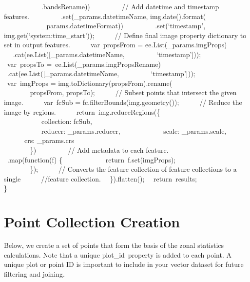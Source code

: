 \documentclass[
  letterpaper,
  DIV=11,
  numbers=noendperiod]{scrreprt}
\begin{document}
\hspace*{0.333em} ~ ~ ~ ~ ~ ~ ~.bandsRename))~ ~ ~ ~ ~ ~// Add datetime
and timestamp features.~ ~ ~ ~ ~ ~.set(\_params.datetimeName,
img.date().format(\\
\hspace*{0.333em} ~ ~ ~ ~ ~ ~ ~\_params.datetimeFormat))~ ~ ~ ~ ~
~.set(`timestamp', img.get(`system:time\_start'));~ ~ ~ ~// Define final
image property dictionary to set in output features.~ ~ ~ ~var~propsFrom
= ee.List(\_params.imgProps)~ ~ ~ ~ ~
~.cat(ee.List({[}\_params.datetimeName,~ ~ ~ ~ ~ ~`timestamp'{]}));~ ~ ~
~var~propsTo =~ee.List(\_params.imgPropsRename)~ ~ ~ ~ ~
~.cat(ee.List({[}\_params.datetimeName,~ ~ ~ ~ ~ ~`timestamp'{]}));~ ~ ~
~var~imgProps = img.toDictionary(propsFrom).rename(\\
\hspace*{0.333em} ~ ~ ~ ~ ~propsFrom, propsTo);~ ~ ~ ~// Subset points
that intersect the given image.~ ~ ~ ~var~fcSub =
fc.filterBounds(img.geometry());~ ~ ~ ~// Reduce the image by regions.~
~ ~ ~return~img.reduceRegions(\{\\
\hspace*{0.333em} ~ ~ ~ ~ ~ ~ ~collection: fcSub,\\
\hspace*{0.333em} ~ ~ ~ ~ ~ ~ ~reducer: \_params.reducer,~ ~ ~ ~ ~ ~ ~
~scale: \_params.scale,~ ~ ~ ~ ~ ~ ~ ~crs: \_params.crs\\
\hspace*{0.333em} ~ ~ ~ ~ ~\})~ ~ ~ ~ ~ ~// Add metadata to each
feature.~ ~ ~ ~ ~ ~.map(function(f) \{~ ~ ~ ~ ~ ~ ~
~return~f.set(imgProps);\\
\hspace*{0.333em} ~ ~ ~ ~ ~\});~ ~ ~ ~// Converts the feature collection
of feature collections to a single~ ~ ~ ~//feature collection.~
~\}).flatten();~ ~return~results;\\
\}

\hypertarget{point-collection-creation}{%
\section{Point Collection Creation}\label{point-collection-creation}}

Below, we create a set of points that form the basis of the zonal
statistics calculations. Note that a unique plot\_id~property is added
to each point. A unique plot or point ID is important to include in your
vector dataset for future filtering and joining.
\end{document}
